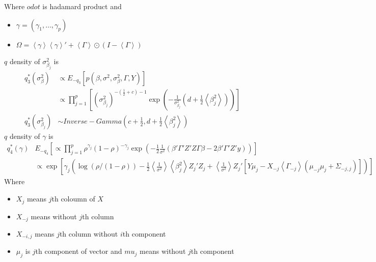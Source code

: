 \documentclass[11pt]{article}
\begin{document}
Where $odot$ is hadamard product and
\begin{itemize}
	\item $\gamma = (\gamma_1,\dots,\gamma_p)$
	\item $\Omega = \left<\gamma\right>\left<\gamma\right>' + \left<\Gamma\right>\odot(I - \left<\Gamma\right>)$
\end{itemize}
$q$ density of $\sigma_{\beta_j}^2$ is
\begin{align*}
q_3^*(\sigma_{\beta}^2) &\propto E_{-q_3}\left[p(\beta,\sigma^2,\sigma_\beta^2,\Gamma , Y)\right]\\
&\propto \prod_{j=1}^{p} \left[\left(\sigma_{\beta_j}^2\right)^{-\left(\frac{1}{2} + c\right)-1}\exp\left(-\frac{1}{\sigma_{\beta_j}^2}\left(d + \frac{1}{2}\left<\beta_j^2\right>\right)\right)\right]\\
q_3^*(\sigma_{\beta_j}^2)&\sim Inverse-Gamma\left(c+ \frac{1}{2}, d + \frac{1}{2}\left<\beta_j^2\right>\right)
\end{align*}
$q$ density of $\gamma$ is
\begin{align*}
q_4^*(\gamma) &E_{-q_4}\left[\propto \prod_{j=1}^{p} \rho^{\gamma_j}(1-\rho)^{-\gamma_j} \exp(-\frac{1}{2}\frac{1}{\sigma^2}\left(\beta'\Gamma'Z'Z\Gamma\beta - 2\beta'\Gamma'Z'y\right))\right]\\
&\propto\exp\left[ \gamma_j \left( \log\left(\rho/(1-\rho)\right) -\frac{1}{2}\left<\frac{1}{\sigma^2}\right> \left<\beta_j^2\right> Z_j'Z_j + \left<\frac{1}{\sigma^2}\right> Z_j'\left[Y\mu_j - X_{-j}\left<\Gamma_{-j}\right>\left(\mu_{-j}\mu_j + \Sigma_{-j,j}\right)\right] \right)\right]
\end{align*} 
Where
\begin{itemize}
	\item $X_j$ means $j$th coloumn of $X$
	\item $X_{-j}$ means without $j$th column
	\item $X_{-i,j}$ means $j$th column without $i$th component 
	\item $\mu_j$ is $j$th component of vector and $mu_j$ means without $j$th component
\end{itemize}
\end{document}
